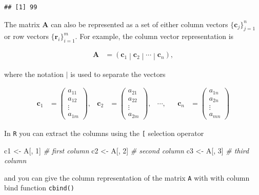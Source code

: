 \documentclass[
]{book}
\newenvironment{Shaded}{\begin{snugshade}}{\end{snugshade}}
\newcommand{\CommentTok}[1]{\textcolor[rgb]{0.56,0.35,0.01}{\textit{#1}}}
\newcommand{\DecValTok}[1]{\textcolor[rgb]{0.00,0.00,0.81}{#1}}
\newcommand{\NormalTok}[1]{#1}
\newcommand{\StringTok}[1]{\textcolor[rgb]{0.31,0.60,0.02}{#1}}
\theoremstyle{definition}
\theoremstyle{definition}
\theoremstyle{definition}
\theoremstyle{remark}
\begin{document}
\begin{verbatim}
## [1] 99
\end{verbatim}

The matrix \(\mathbf{A}\) can also be represented as a set of either column vectors \(\{\mathbf{c}_j \}_{j=1}^n\) or row vectors \(\{\mathbf{r}_i \}_{i=1}^m\). For example, the column vector representation is

\[
\begin{aligned}
\mathbf{A} & = \left( \mathbf{c}_{1} \middle| \mathbf{c}_{2} \middle| \cdots \middle| \mathbf{c}_{n} \right),
\end{aligned}
\]

where the notation \(|\) is used to separate the vectors

\[
\begin{aligned}
\mathbf{c}_1 & = \begin{pmatrix} a_{11} \\ a_{12} \\ \vdots \\ a_{1m}
\end{pmatrix},
& \mathbf{c}_2 & = \begin{pmatrix} a_{21} \\ a_{22} \\ \vdots \\ a_{2m}
\end{pmatrix}, 
& \cdots, &
& \mathbf{c}_n & = \begin{pmatrix} a_{1n} \\ a_{2n} \\ \vdots \\ a_{mn}
\end{pmatrix}
\end{aligned}
\]

In \texttt{R} you can extract the columns using the \texttt{{[}} selection operator

\begin{Shaded}
\begin{Highlighting}[]
\NormalTok{c1 <-}\StringTok{ }\NormalTok{A[, }\DecValTok{1}\NormalTok{] }\CommentTok{# first column}
\NormalTok{c2 <-}\StringTok{ }\NormalTok{A[, }\DecValTok{2}\NormalTok{] }\CommentTok{# second column}
\NormalTok{c3 <-}\StringTok{ }\NormalTok{A[, }\DecValTok{3}\NormalTok{] }\CommentTok{# third column}
\end{Highlighting}
\end{Shaded}

and you can give the column representation of the matrix \texttt{A} with with column bind function \texttt{cbind()}
\end{document}
